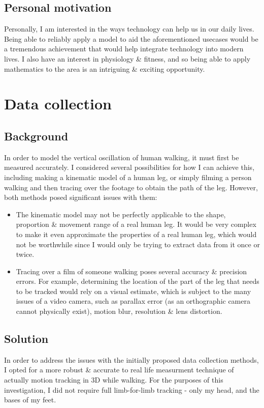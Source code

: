 \documentclass[12pt, a4paper]{article}
\begin{document}
\subsection{Personal motivation}
Personally, I am interested in the ways technology can help us in our daily
lives. Being able to reliably apply a model to aid the aforementioned usecases
would be a tremendous achievement that would help integrate technology into
modern lives. 
I also have an interest in physiology \& fitness,
and so being able to apply mathematics to the area is an intriguing \& exciting
opportunity.

\section{Data collection}
\subsection{Background}
In order to model the vertical oscillation of human walking, it must first be
measured accurately. I considered several possibilities for how I can achieve
this, including making a kinematic model of a human leg, or simply filming a
person walking and then tracing over the footage to obtain the path of the leg.
However, both methods posed significant issues with them:
\begin{itemize}
    \item The kinematic model may not be perfectly applicable to the shape,
          proportion \& movement range of a real human leg. It would be very
          complex to make it even approximate the properties of a real human
          leg, which would not be worthwhile since I would only be trying to
          extract data from it once or twice.
    \item Tracing over a film of someone walking poses several accuracy \&
          precision errors. For example, determining the location of the part of
          the leg that needs to be tracked would rely on a visual estimate,
          which is subject to the many issues of a video camera, such as
          parallax error (as an orthographic camera cannot physically exist),
          motion blur, resolution \& lens distortion.
\end{itemize}

\subsection{Solution}
In order to address the issues with the initially proposed data collection
methods, I opted for a more robust \& accurate to real life measurment technique
of actually motion tracking in 3D while walking. For the purposes of this
investigation, I did not require full limb-for-limb tracking - only my head, and
the bases of my feet. \\
\end{document}

